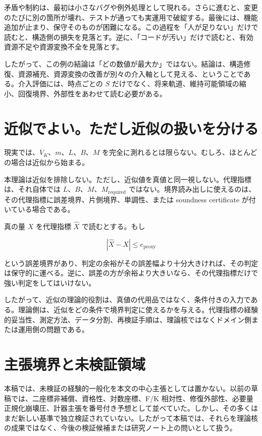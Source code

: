\documentclass[12pt,a4paper]{article}
\begin{document}
矛盾や制約は、最初は小さなバグや例外処理として現れる。さらに進むと、変更のたびに別の箇所が壊れ、テストが通っても実運用で破綻する。最後には、機能追加が止まり、保守そのものが困難になる。この過程を「人が足りない」だけで読むと、構造側の損失を見落とす。逆に、「コードが汚い」だけで読むと、有効資源不足や資源変換不全を見落とす。

したがって、この例の結論は「どの数値が最大か」ではない。結論は、構造修復、資源補充、資源変換の改善が別々の介入軸として見える、ということである。介入評価には、時点ごとの \(S\) だけでなく、将来軌道、維持可能領域の縮小、回復境界、外部性をあわせて読む必要がある。

\section{近似でよい。ただし近似の扱いを分ける}\label{ux8fd1ux4f3cux3067ux3088ux3044ux305fux3060ux3057ux8fd1ux4f3cux306eux6271ux3044ux3092ux5206ux3051ux308b}

現実では、\(V_K\)、\(m\)、\(L\)、\(B\)、\(M\) を完全に測れるとは限らない。むしろ、ほとんどの場合は近似から始まる。

本理論は近似を排除しない。ただし、近似値を真値と同一視しない。代理指標は、それ自体では \(L\)、\(B\)、\(M\)、\(M_{\mathrm{required}}\) ではない。境界読み出しに使えるのは、その代理指標に誤差境界、片側境界、単調性、または soundness certificate が付いている場合である。

真の量 \(X\) を代理指標 \(\hat X\) で読むとする。もし

\[
|\hat X-X|\le e_{\mathrm{proxy}}
\]

という誤差境界があり、判定の余裕がその誤差幅より十分大きければ、その判定は保守的に運べる。逆に、誤差の方が余裕より大きいなら、その代理指標だけで強い判定をしてはいけない。

したがって、近似の理論的役割は、真値の代用品ではなく、条件付きの入力である。理論側は、近似をどの条件で境界判定に使えるかを与える。代理指標の経験的妥当性、測定方法、データ分割、再検証手順は、理論核ではなくドメイン側または運用側の問題である。

\section{主張境界と未検証領域}\label{ux4e3bux5f35ux5883ux754cux3068ux672aux691cux8a3cux9818ux57df}

本稿では、未検証の経験的一般化を本文の中心主張としては置かない。以前の草稿では、二座標非補償、資格性、対数座標、F/K 相対性、修復外部性、必要量正規化崩壊圧、計器主張を番号付き予想として並べていた。しかし、その多くはまだ新しい基準で独立検証されていない。したがって本稿では、それらを理論核の成果ではなく、今後の検証候補または研究ノート上の問いとして扱う。
\end{document}
